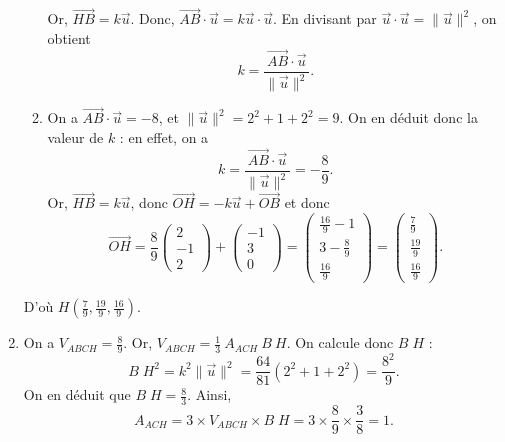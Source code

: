 \documentclass[a4paper]{report}
\begin{document}
\begin{enumerate}
\begin{enumerate}
					Or, $\vec{HB} = k \vec{u}$. Donc, $\vec{AB} \cdot \vec{u} = k \vec{u} \cdot \vec{u}$. En divisant par $\vec{u}\cdot \vec{u} = \|\vec{u}\|^2$, on obtient \[
						k = \frac{\vec{AB} \cdot  \vec{u}}{\|\vec{u}\|^2}
					.\]
				\item On a $\vec{AB} \cdot \vec{u} = -8$, et $\|\vec{u}\|^2 = 2^2 + 1 + 2^2 = 9$. On en déduit donc la valeur de $k$ : en effet, on a \[
						k = \frac{\vec{AB} \cdot \vec{u}}{\|\vec{u}\|^2} = -\frac{8}{9}
					.\] Or, $\vec{HB} = k \vec{u}$, donc $\vec{OH} = -k \vec{u} + \vec{OB}$ et donc \[
						\vec{OH} = \frac{8}{9}\begin{pmatrix}
							2\\-1\\2
						\end{pmatrix} + \begin{pmatrix}
							-1\\3\\0
						\end{pmatrix} = \begin{pmatrix}
							\frac{16}{9} - 1\\
							3-\frac{8}{9}\\
							\frac{16}{9}
						\end{pmatrix} = \begin{pmatrix}
							\frac{7}{9}\\[2mm]
							\frac{19}{9}\\[2mm]
							\frac{16}{9}
						\end{pmatrix}
					.\]
			\end{enumerate}
			D'où $H\left( \frac{7}{9},\frac{19}{9},\frac{16}{9} \right)$.
		\item On a $V_{ABCH} = \frac{8}{9}$. Or, $V_{ABCH} = \frac{1}{3}\: A_{ACH}\: B\!\:\!H$. On calcule donc $B\!\;\!H$ :
			\[
				B\!\;\!H^2 = k^2 \|\vec{u}\|^2 = \frac{64}{81} (2^2 + 1 + 2^2) = \frac{8^2}{9}
			.\] On en déduit que $B\!\;\!H = \frac{8}{3}$. Ainsi, \[
				A_{ACH} = 3\times V_{ABCH}\times B\!\;\!H = 3\times \frac{8}{9}\times \frac{3}{8} = 1
			.\]
	\end{enumerate}
\end{document}
